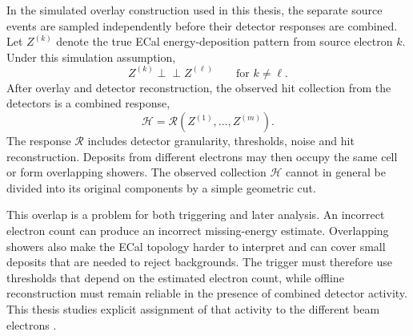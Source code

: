 In the simulated overlay construction used in this thesis, the separate
source events are sampled independently before their detector responses are
combined. Let \(Z^{(k)}\) denote the true ECal energy-deposition pattern from
source electron \(k\). Under this simulation assumption,
\begin{equation}
    Z^{(k)} \perp\!\!\!\perp Z^{(\ell)}
    \qquad \text{for } k\neq\ell .
\end{equation}
After overlay and detector reconstruction, the observed hit collection from the detectors is a
combined response,
\begin{equation}
    \mathcal{H}
    =
    \mathcal{R}\!\left(
        Z^{(1)},\ldots,Z^{(m)}
    \right).
\end{equation}
The response \(\mathcal{R}\) includes detector granularity, thresholds,
noise and hit reconstruction. Deposits from different electrons may then
occupy the same cell or form overlapping showers. The observed collection
\(\mathcal{H}\) cannot in general be divided into its original components by
a simple geometric cut.

This overlap is a problem for both triggering and later analysis. An
incorrect electron count can produce an incorrect missing-energy estimate.
Overlapping showers also make the ECal topology harder to interpret and can
cover small deposits that are needed to reject backgrounds. The trigger must
therefore use thresholds that depend on the estimated electron count, while
offline reconstruction 
must remain reliable in the presence of combined detector activity. 
This thesis studies explicit assignment of that activity
to the different beam electrons \cite{ldmx2025-overview}.

